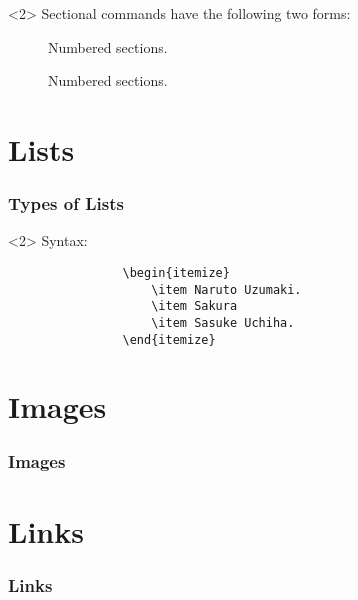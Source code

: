 \documentclass{beamer}
\begin{document}
\begin{frame}[fragile]
		\begin{onlyenv}<2>
			Sectional commands have the following two forms:
			\begin{description}
				\item[\texttt{\section{}}] Numbered sections.
				\item[\texttt{\section*{}}] Numbered sections.
			\end{description}
		\end{onlyenv}
	\end{frame}

	\section{Lists}
	\begin{frame}[fragile]
		\frametitle{Types of Lists}
		\begin{onlyenv}<2>
			Syntax:
			\begin{verbatim}
				\begin{itemize}
					\item Naruto Uzumaki.
					\item Sakura
					\item Sasuke Uchiha.
				\end{itemize}
			\end{verbatim}
		\end{onlyenv}
	\end{frame}
	

	\section{Images}
	\begin{frame}
		\frametitle{Images}
		
	\end{frame}

	\section{Links}
	\begin{frame}
		\frametitle{Links}
	\end{frame}
\end{document}
